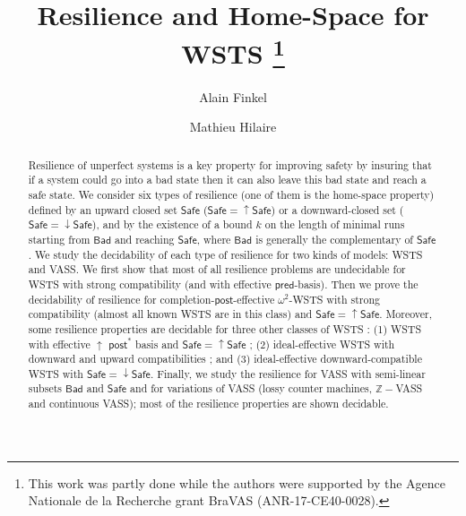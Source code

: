 \documentclass[runningheads]{llncs}
\newcommand{\pred}{\textsf{pred}}
\newcommand{\post}{\textsf{post}}
\newcommand{\Bad}{\textsf{Bad}}
\newcommand{\Safe}{\textsf{Safe}}
\begin{document}
%
\title{Resilience and Home-Space for WSTS \thanks{This work was partly done while the authors were supported by the Agence Nationale de la Recherche grant BraVAS (ANR-17-CE40-0028).}} 
%
%
\author{Alain Finkel \and Mathieu Hilaire}
%
%

%
\maketitle              %
%





\begin{abstract}
\noindent
Resilience of unperfect systems is a key property for improving safety by insuring that if a system could go into a bad state then it can also leave this bad state and reach a safe state.
We consider six types of resilience (one of them is the home-space property) defined by an upward closed set $\Safe$  ($\Safe=\mathop{\uparrow} \Safe$) or a downward-closed set ($\Safe=\mathop{\downarrow} \Safe$), and by the existence of a bound $k$ on the length of minimal runs starting from $\Bad$ and reaching $\Safe$, where $\Bad$ is generally the complementary of $\Safe$. We study the decidability of each type of resilience for two kinds of models: WSTS and VASS. We first show that most of all resilience problems are undecidable for WSTS with strong compatibility (and with effective $\pred$-basis). Then we prove the decidability of resilience for completion-$\post$-effective $\omega^2$-WSTS with strong compatibility (almost all known WSTS are in this class) and $\Safe = \mathop{\uparrow} \Safe$. Moreover, some resilience properties are decidable for three other classes of WSTS : (1) WSTS with effective 
$\mathop{\uparrow}$ $\post^*$ basis and $\Safe=\mathop{\uparrow} \Safe$ ; (2) ideal-effective WSTS with downward and upward compatibilities ; and (3) ideal-effective downward-compatible WSTS with $\Safe=\mathop{\downarrow} \Safe$. Finally, we study the resilience for VASS with semi-linear subsets $\Bad$ and $\Safe$ and for variations of VASS (lossy counter machines,  $\mathbb{Z}-$VASS and continuous VASS); most of the resilience properties are shown decidable.
\end{abstract}
\end{document}
